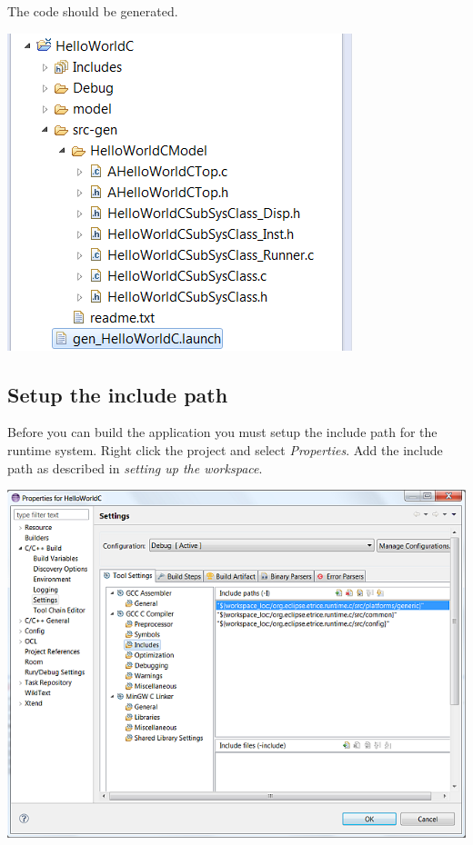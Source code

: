 The code should be generated.

\includegraphics{images/016-HelloWorldC13.png}

\subsection{Setup the include path}

Before you can build the application you must setup the include path for the runtime system. Right click 
the project and select \textit{Properties}. Add the include path as described in \textit{setting up the 
workspace}.

\includegraphics{images/016-HelloWorldC14.png}

